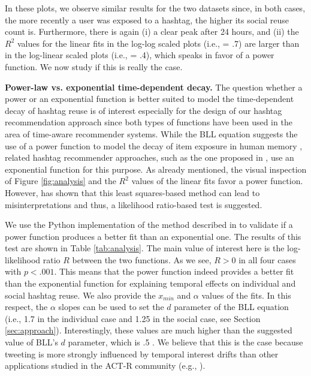 \documentclass{sig-alternate-05-2015}
\newcommand{\para}[1]{\vspace{2mm}\noindent\textbf{#1}}
\begin{document}
In these plots, we observe similar results for the two datasets since, in both cases, the more recently a user was exposed to a hashtag, the higher its social reuse count is. Furthermore, there is again (i) a clear peak after 24 hours, and (ii) the $R^2$ values for the linear fits in the log-log scaled plots (i.e., = .7) are larger than in the log-linear scaled plots (i.e., = .4), which speaks in favor of a power function. We now study if this is really the case.

\para{Power-law vs. exponential time-dependent decay.} The question whether a power or an exponential function is better suited to model the time-dependent decay of hashtag reuse is of interest especially for the design of our hashtag recommendation approach since both types of functions have been used in the area of time-aware recommender systems. While the BLL equation suggests the use of a power function to model the decay of item exposure in human memory \cite{anderson_reflections_1991}, related hashtag recommender approaches, such as the one proposed in \cite{harvey2015long}, use an exponential function for this purpose. As already mentioned, the visual inspection of Figure \ref{fig:analysis} and the $R^2$ values of the linear fits favor a power function. However, \cite{clauset2009power} has shown that this least squares-based method can lead to misinterpretations and thus, a likelihood ratio-based test is suggested.
 
We use the Python implementation \cite{alstott2014powerlaw} of the method described in \cite{clauset2009power} to validate if a power function produces a better fit than an exponential one. The results of this test are shown in Table \ref{tab:analysis}. The main value of interest here is the log-likelihood ratio $R$ between the two functions. As we see, $R > 0$ in all four cases with $p < .001$. This means that the power function indeed provides a better fit than the exponential function for explaining temporal effects on individual and social hashtag reuse. We also provide the $x_{min}$ and $\alpha$ values of the fits. In this respect, the $\alpha$ slopes can be used to set the $d$ parameter of the BLL equation (i.e., 1.7 in the individual case and 1.25 in the social case, see Section \ref{sec:approach}). Interestingly, these values are much higher than the suggested value of BLL's $d$ parameter, which is .5 \cite{anderson2004integrated}. We believe that this is the case because tweeting is more strongly influenced by temporal interest drifts than other applications studied in the ACT-R community (e.g., \cite{anderson_reflections_1991}).
\end{document}
